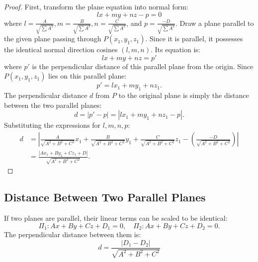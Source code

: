 \begin{proof}
First, transform the plane equation into normal form:
\begin{equation}
    lx + my + nz - p = 0
\end{equation}
where $l = \frac{A}{\sqrt{\sum A^2}}, m = \frac{B}{\sqrt{\sum A^2}}, n = \frac{C}{\sqrt{\sum A^2}}$, and $p = \frac{-D}{\sqrt{\sum A^2}}$.
Draw a plane parallel to the given plane passing through $P(x_1, y_1, z_1)$.
Since it is parallel, it possesses the identical normal direction cosines $(l, m, n)$. Its equation is:
\begin{equation}
    lx + my + nz = p'
\end{equation}
where $p'$ is the perpendicular distance of this parallel plane from the origin.
Since $P(x_1, y_1, z_1)$ lies on this parallel plane:
\begin{equation}
    p' = lx_1 + my_1 + nz_1.
\end{equation}
The perpendicular distance $d$ from $P$ to the original plane is simply the distance between the two parallel planes:
\begin{equation}
    d = |p' - p| = |lx_1 + my_1 + nz_1 - p|.
\end{equation}
Substituting the expressions for $l, m, n, p$:
\begin{align}
    d &= \left| \frac{A}{\sqrt{A^2+B^2+C^2}}x_1 + \frac{B}{\sqrt{A^2+B^2+C^2}}y_1 + \frac{C}{\sqrt{A^2+B^2+C^2}}z_1 - \left(\frac{-D}{\sqrt{A^2+B^2+C^2}}\right) \right| \nonumber\\
    &= \frac{|Ax_1 + By_1 + Cz_1 + D|}{\sqrt{A^2 + B^2 + C^2}}.
\end{align}
\end{proof}

\subsection{Distance Between Two Parallel Planes}
If two planes are parallel, their linear terms can be scaled to be identical:
\begin{equation}
    \Pi_1: Ax + By + Cz + D_1 = 0, \quad \Pi_2: Ax + By + Cz + D_2 = 0.
\end{equation}
The perpendicular distance between them is:
\begin{equation}
    \boxed{d = \frac{|D_1 - D_2|}{\sqrt{A^2 + B^2 + C^2}}}
\end{equation}

